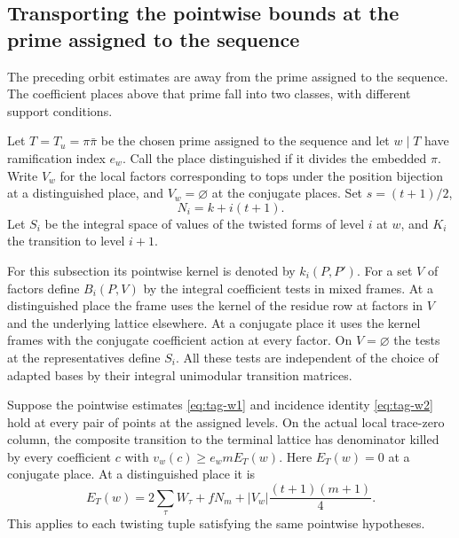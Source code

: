 \subsection{Transporting the pointwise bounds at the prime assigned to the sequence}
\label{subsec:word-period}

The preceding orbit estimates are away from the prime assigned to the sequence. The coefficient places above that prime fall into two classes, with different support conditions.

Let \(T=T_u=\pi\bar\pi\) be the chosen prime assigned to the sequence and let \(w\mid T\)
have ramification index \(e_w\). Call the place distinguished if it
divides the embedded \(\pi\). Write \(V_w\) for the local factors
corresponding to tops under the position bijection at a distinguished
place, and \(V_w=\varnothing\) at the conjugate places. Set
\(s=(t+1)/2\), 
\[
  N_i=k+i(t+1).
\]
 Let \(S_i\) be the integral space
of values of the twisted forms of level \(i\) at \(w\), and \(K_i\)
the transition to level \(i+1\).

For this subsection its pointwise
kernel is denoted by \(k_i(P,P')\). For a set \(V\) of factors
define \(B_i(P,V)\) by the integral coefficient tests in mixed
frames. At a distinguished place the frame uses the kernel of the
residue row at factors in \(V\) and the underlying lattice elsewhere.
At a conjugate place it uses the kernel frames with the conjugate
coefficient action at every factor. On \(V=\varnothing\) the tests
at the representatives define \(S_i\). All these tests are
independent of the choice of adapted bases by their integral
unimodular transition matrices.

\begin{proposition}\label{prop:word-prime-transfer}
Suppose the pointwise estimates \eqref{eq:tag-w1} and incidence identity
\eqref{eq:tag-w2} hold at every pair of points at the assigned levels.
On the actual local trace-zero column, the composite transition
to the terminal lattice has denominator killed by every
coefficient \(c\) with \(v_w(c)\ge e_w m E_T(w)\).
Here \(E_T(w)=0\) at a conjugate place. At a distinguished
place it is
\[
 E_T(w)=2\sum_\tau W_\tau+fN_m+
              |V_w|\frac{(t+1)(m+1)}4.
\]
This applies to each twisting tuple satisfying the same
pointwise hypotheses.
\end{proposition}

